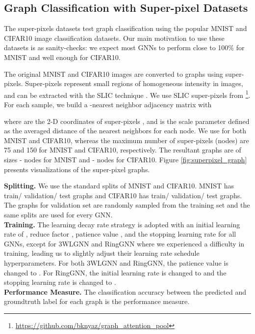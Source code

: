 \documentclass{article}
\begin{document}
\subsection{Graph Classification with Super-pixel Datasets}
The super-pixels datasets test graph classification using the popular MNIST and CIFAR10 image classification datasets.
Our main motivation to use these datasets is as sanity-checks: we expect most GNNs to perform close to 100\% for MNIST and well enough for CIFAR10.

The original MNIST and CIFAR10 images are converted to graphs using super-pixels. Super-pixels represent small regions of homogeneous intensity in images, and can be extracted with the SLIC technique \cite{10.1109/TPAMI.2012.120}. 
We use SLIC super-pixels from \cite{knyazev2019understanding}\footnote{\small{\url{https://github.com/bknyaz/graph_attention_pool}}}. 
For each sample, we build a -nearest neighbor adjacency matrix with
 
where  are the 2-D coordinates of super-pixels , and  is the scale parameter defined as the averaged distance  of the  nearest neighbors for each node. We use  for both MNIST and CIFAR10, whereas the maximum number of super-pixels (nodes) are 75 and 150 for MNIST and CIFAR10, respectively. The resultant graphs are of sizes - nodes for MNIST and - nodes for CIFAR10. Figure \ref{fig:superpixel_graph} presents visualizations of the super-pixel graphs. 





{\bf Splitting.} We use the standard splits of MNIST and CIFAR10. MNIST has  train/ validation/ test graphs and CIFAR10 has  train/ validation/ test graphs. The  graphs for validation set are randomly sampled from the training set and the same splits are used for every GNN.\\
{\bf Training.} The learning decay rate strategy is adopted with an initial learning rate of , reduce factor , patience value , and the stopping learning rate  for all GNNs, except for 3WLGNN and RingGNN where we experienced a difficulty in training, leading us to slightly adjust their learning rate schedule hyperparameters. For both 3WLGNN and RingGNN, the patience value is changed to . For RingGNN, the initial learning rate is changed to  and the stopping learning rate is changed to .\\
{\bf Performance Measure.} The classification accuracy between the predicted and groundtruth label for each graph is the performance measure.
\end{document}
